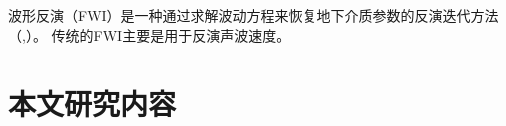 波形反演（FWI）是一种通过求解波动方程来恢复地下介质参数的反演迭代方法（,）。
传统的FWI主要是用于反演声波速度。
\vspace{0.5cm}
\section{本文研究内容}


















